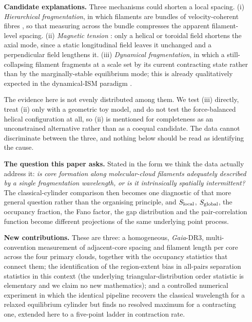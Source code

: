 \documentclass[usenatbib,twoside,twocolumn]{mnras}
\begin{document}
\smallskip\noindent\textbf{Candidate explanations.} Three mechanisms could shorten a local spacing. (i) \emph{Hierarchical fragmentation}, in which filaments are bundles of velocity-coherent fibres \citep{Hacar2013,Hacar2018,Yang2024}, so that measuring across the bundle compresses the apparent filament-level spacing. (ii) \emph{Magnetic tension} \citep{Nakamura1993}: only a helical or toroidal field shortens the axial mode, since a static longitudinal field leaves it unchanged and a perpendicular field lengthens it. (iii) \emph{Dynamical fragmentation}, in which a still-collapsing filament fragments at a scale set by its current contracting state rather than by the marginally-stable equilibrium mode; this is already qualitatively expected in the dynamical-ISM paradigm \citep{Andre2014,Clarke2016,Clarke2017,Clarke2020}.

The evidence here is not evenly distributed among them. We test (iii) directly, treat (ii) only with a geometric toy model, and do not test the force-balanced helical configuration at all, so (ii) is mentioned for completeness as an unconstrained alternative rather than as a coequal candidate. The data cannot discriminate between the three, and nothing below should be read as identifying the cause.

\smallskip\noindent\textbf{The question this paper asks.} Stated in the form we think the data actually address it: \emph{is core formation along molecular-cloud filaments adequately described by a single fragmentation wavelength, or is it intrinsically spatially intermittent?} The classical-cylinder comparison then becomes one diagnostic of that more general question rather than the organising principle, and $S_{\rm local}$, $S_{\rm global}$, the occupancy fraction, the Fano factor, the gap distribution and the pair-correlation function become different projections of the same underlying point process.

\smallskip\noindent\textbf{New contributions.} These are three: a homogeneous, \textit{Gaia}-DR3, multi-convention measurement of adjacent-core spacing and filament length per core across the four primary clouds, together with the occupancy statistics that connect them; the identification of the region-extent bias in all-pairs separation statistics in this context (the underlying triangular-distribution order statistic is elementary and we claim no new mathematics); and a controlled numerical experiment in which the identical pipeline recovers the classical wavelength for a relaxed equilibrium cylinder but finds no resolved maximum for a contracting one, extended here to a five-point ladder in contraction rate.
\end{document}
